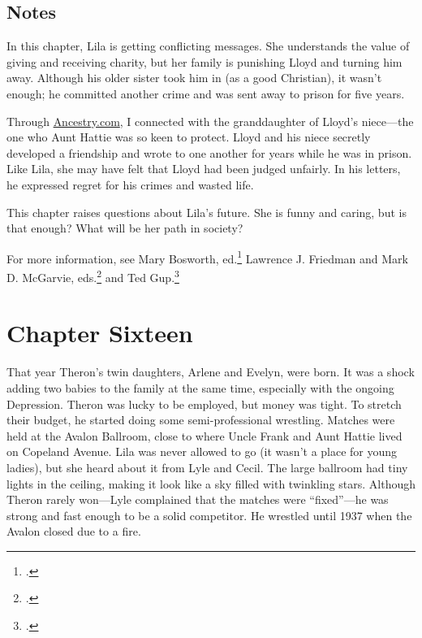 \documentclass[
  american,
  letterpaper,
]{book}
\begin{document}
\section{Notes}\label{notes-16}

In this chapter, Lila is getting conflicting messages. She understands
the value of giving and receiving charity, but her family is punishing
Lloyd and turning him away. Although his older sister took him in (as a
good Christian), it wasn't enough; he committed another crime and was
sent away to prison for five years.

Through \href{https://www.ancestry.com/}{Ancestry.com}, I connected with
the granddaughter of Lloyd's niece---the one who Aunt Hattie was so keen
to protect. Lloyd and his niece secretly developed a friendship and
wrote to one another for years while he was in prison. Like Lila, she
may have felt that Lloyd had been judged unfairly. In his letters, he
expressed regret for his crimes and wasted life.

This chapter raises questions about Lila's future. She is funny and
caring, but is that enough? What will be her path in society?

For more information, see Mary Bosworth, ed.\footnote{.} Lawrence J. Friedman and Mark D. McGarvie,
eds.\footnote{.}
and Ted Gup.\footnote{.}


\chapter{Chapter Sixteen}\label{chapter-sixteen}

That year Theron's twin daughters, Arlene and Evelyn, were born. It was
a shock adding two babies to the family at the same time, especially
with the ongoing Depression. Theron was lucky to be employed, but money
was tight. To stretch their budget, he started doing some
semi-professional wrestling. Matches were held at the Avalon Ballroom,
close to where Uncle Frank and Aunt Hattie lived on Copeland Avenue.
Lila was never allowed to go (it wasn't a place for young ladies), but
she heard about it from Lyle and Cecil. The large ballroom had tiny
lights in the ceiling, making it look like a sky filled with twinkling
stars. Although Theron rarely won---Lyle complained that the matches
were ``fixed''---he was strong and fast enough to be a solid competitor.
He wrestled until 1937 when the Avalon closed due to a fire.
\end{document}
